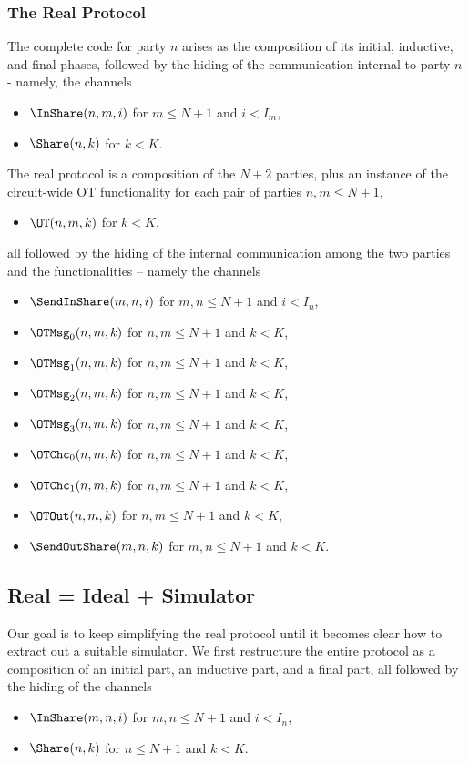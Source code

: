 \subsubsection{The Real Protocol}
The complete code for party $n$ arises as the composition of its initial, inductive, and final phases, followed by the hiding of the communication internal to party $n$ - namely, the channels
\begin{itemize}
\item $\InShare(n,m,i)$ for $m \leq N+1$ and $i < I_m$,
\item $\Share(n,k)$ for $k < K$.
\end{itemize}
The real protocol is a composition of the $N+2$ parties, plus an instance of the circuit-wide OT functionality for each pair of parties $n,m \leq N+1$,
\begin{itemize}
\item $\OT(n,m,k)$ for $k < K$,
\end{itemize}
all followed by the hiding of the internal communication among the two parties and the functionalities -- namely the channels
\begin{itemize}
\item $\SendInShare(m,n,i)$ for $m,n \leq N+1$ and $i < I_n$,
\item $\OTMsg_0(n,m,k)$ for $n,m \leq N+1$ and $k < K$,
\item $\OTMsg_1(n,m,k)$ for $n,m \leq N+1$ and $k < K$,
\item $\OTMsg_2(n,m,k)$ for $n,m \leq N+1$ and $k < K$,
\item $\OTMsg_3(n,m,k)$ for $n,m \leq N+1$ and $k < K$,
\item $\OTChc_0(n,m,k)$ for $n,m \leq N+1$ and $k < K$,
\item $\OTChc_1(n,m,k)$ for $n,m \leq N+1$ and $k < K$,
\item $\OTOut(n,m,k)$ for $n,m \leq N+1$ and $k < K$,
\item $\SendOutShare(m,n,k)$ for $m,n \leq N+1$ and $k < K$.
\end{itemize}

\subsection{Real = Ideal + Simulator}
Our goal is to keep simplifying the real protocol until it becomes clear how to extract out a suitable simulator. We first restructure the entire protocol as a composition of an initial part, an inductive part, and a final part, all followed by the hiding of the channels
\begin{itemize}
\item $\InShare(m,n,i)$ for $m,n \leq N+1$ and $i < I_n$,
\item $\Share(n,k)$ for $n \leq N+1$ and $k < K$.
\end{itemize}

